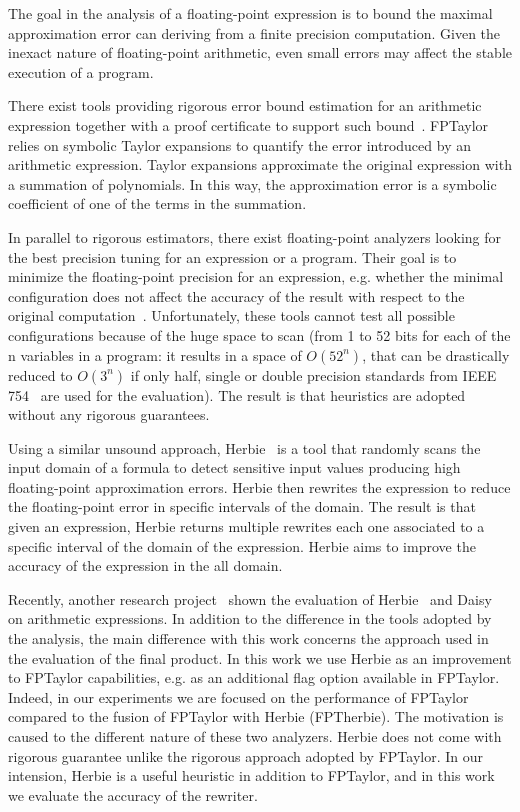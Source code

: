 \documentclass[runningheads]{llncs}
\begin{document}
The goal in the analysis of a floating-point expression is to bound the maximal approximation error can deriving from a finite precision computation. Given the inexact nature of floating-point arithmetic, even small errors may affect the stable execution of a program.

There exist tools providing rigorous error bound estimation for an arithmetic expression together with a proof certificate to support such bound~\cite{fptaylor,magron,precisa,daisy}. FPTaylor~\cite{fptaylor} relies on symbolic Taylor expansions to quantify the error introduced by an arithmetic expression. Taylor expansions approximate the original expression with a summation of polynomials. In this way, the approximation error is a symbolic coefficient of one of the terms in the summation.

In parallel to rigorous estimators, there exist floating-point analyzers looking for the best precision tuning for an expression or a program. Their goal is to minimize the floating-point precision for an expression, e.g. whether the minimal configuration does not affect the accuracy of the result with respect to the original computation~\cite{mixedLam,herbgrind,precimonius}.
Unfortunately, these tools cannot test all possible configurations because of the huge space to scan (from 1 to 52 bits for each of the n variables in a program: it results in a space of $O(52^n)$, that can be drastically reduced to $O(3^n)$ if only half, single or double precision standards from IEEE 754~\cite{ieee} are used for the evaluation). 
The result is that heuristics are adopted without any rigorous guarantees.

Using a similar unsound approach, Herbie~\cite{herbie} is a tool that randomly scans the input domain of a formula to detect sensitive input values producing high floating-point approximation errors. Herbie then rewrites the expression to reduce the floating-point error in specific intervals of the domain. The result is that given an expression, Herbie returns multiple rewrites each one associated to a specific interval of the domain of the expression. 
Herbie aims to improve the accuracy of the expression in the all domain.

Recently, another research project~\cite{daisyherbie} shown the evaluation of Herbie~\cite{herbie} and Daisy~\cite{daisy} on arithmetic expressions. In addition to the difference in the tools adopted by the analysis, the main difference with this work concerns the approach used in the evaluation of the final product. In this work we use Herbie as an improvement to FPTaylor capabilities, e.g. as an additional flag option available in FPTaylor. Indeed, in our experiments we are focused on the performance of FPTaylor compared to the fusion of FPTaylor with Herbie (FPTherbie). The motivation is caused to the different nature of these two analyzers. Herbie does not come with rigorous guarantee unlike the rigorous approach adopted by FPTaylor. In our intension, Herbie is a useful heuristic in addition to FPTaylor, and in this work we evaluate the accuracy of the rewriter.
\end{document}
